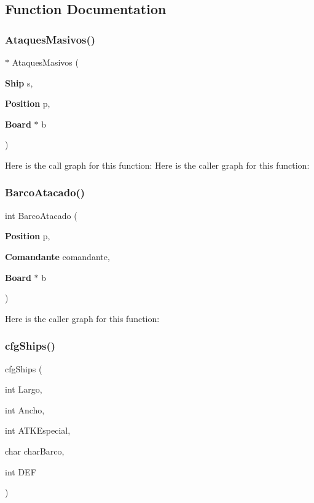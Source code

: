\subsection{Function Documentation}
\label{funciones_8h_a61dcba4f41ed411eb45956ed8b5c174b} 
\subsubsection{Ataques\+Masivos()}
{\footnotesize{}$\ast$ Ataques\+Masivos (\begin{DoxyParamCaption}\item[{{\bf Ship}}]{s,  }\item[{{\bf Position}}]{p,  }\item[{{\bf Board} $\ast$}]{b }\end{DoxyParamCaption})}

Here is the call graph for this function\+:
Here is the caller graph for this function\+:
\label{funciones_8h_a239d2a4d17c05ed3c75c7355fe010abb} 
\subsubsection{Barco\+Atacado()}
{\footnotesize\ttfamily int Barco\+Atacado (\begin{DoxyParamCaption}\item[{{\bf Position}}]{p,  }\item[{{\bf Comandante}}]{comandante,  }\item[{{\bf Board} $\ast$}]{b }\end{DoxyParamCaption})}

Here is the caller graph for this function\+:
\label{funciones_8h_a3ff7ba459575ce6387fc046876832c56} 
\subsubsection{cfg\+Ships()}
{\footnotesize{} cfg\+Ships (\begin{DoxyParamCaption}\item[{int}]{Largo,  }\item[{int}]{Ancho,  }\item[{int}]{A\+T\+K\+Especial,  }\item[{char}]{char\+Barco,  }\item[{int}]{D\+EF }\end{DoxyParamCaption})}


